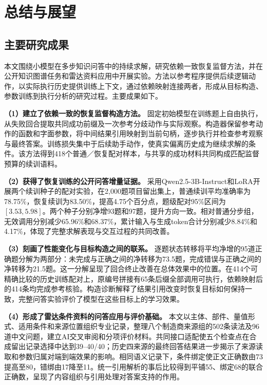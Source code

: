 \chapter{总结与展望}
\label{chap:conclusion}

\section{主要研究成果}

本文围绕小模型在多步知识问答中的持续求解，研究依赖一致恢复监督方法，并在公开知识图谱任务和雷达资料应用中开展实验。方法以参考程序提供后续逻辑动作，以实际执行历史提供训练上下文，通过依赖映射连接两者，形成从目标构造、参数训练到执行分析的研究过程。主要成果如下。

\textbf{（1）建立了依赖一致的恢复监督构造方法。}
固定初始模型在训练题上自由执行，从失败回合提取共同成功前缀及一次参考分歧动作与实际观察。构造器保留参考动作的函数和字面参数，将中间结果引用映射到当前句柄，逐步执行并检查参考观察与最终答案。训练损失集中于后续助手动作，使真实偏离历史成为继续求解的条件。该方法得到418个普通／恢复配对样本，与共享的成功材料共同构成匹配监督预算的续训语料。

\textbf{（2）获得了恢复训练的公开问答增量证据。}
采用Qwen2.5-3B-Instruct和LoRA开展两个续训种子的配对实验，在2,000题项目留出集上，普通续训平均准确率为78.75\%，恢复续训为83.50\%，提高4.75个百分点，题级配对95\%区间为$[3.53,5.98]$。两个种子分别净增93题和97题，提升方向一致。相对普通分步组，无效调用分别减少65.96\%和68.37\%，累计输入与生成token合计分别减少8.84\%和4.17\%，体现了完整求解表现与交互过程的共同改善。

\textbf{（3）刻画了性能变化与目标构造之间的联系。}
逐题状态转移将平均净增的95道正确题分解为两部分：未完成与正确之间的净转移为73.5题，完成错误与正确之间的净转移为21.5题。这一分解呈现了回合终止改善在总体效果中的位置。在414个可精确比较的历史训练配对上，原编号拼接有65条后缀全部调用可执行，依赖映射后的414条均完成参考核验。构造诊断解释了结果引用改变时恢复目标如何保持一致，完整问答实验评价了模型在这些目标上的学习效果。

\textbf{（4）形成了雷达条件资料的问答应用与评价基础。}
本文以主体、部件、量值形式、适用条件和来源位置组织专业记录，整理八个制造商来源组的502条读法及96道中文问题，建立AI交叉审阅和分项评价材料。共同接口适配使五个检查点在合成留出记录选择中达到39--40/40；历史四来源的最终回答结果进一步揭示了来源读取和参数归属对端到端效果的影响。相同语义记录下，条件绑定使正文正确数由73提高至80，错绑由17降至11。统一引用解析的事后比较得到平铺55、绑定68的联合正确数，呈现了内容组织与引用处理对答案支持的作用。

